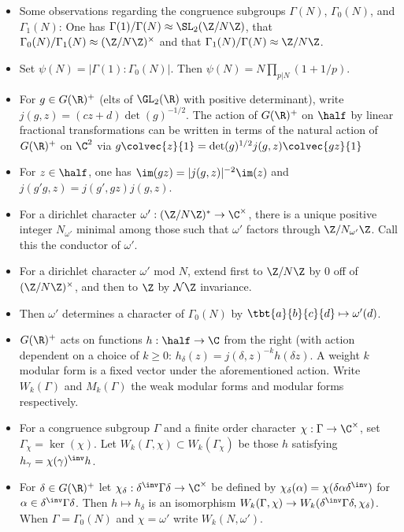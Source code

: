 \documentclass[11pt]{amsart}
\begin{document}
\begin{itemize}
   \item  Some observations regarding the congruence subgroups $\Gamma(N)$, $\Gamma_0(N)$, and $\Gamma_1(N)$: One has $\Gamma(1)/\Gamma(N) \approx \SL_2(\Z/N\Z)$,  that $\Gamma_0(N)/ \Gamma_1(N) \approx (\Z/N\Z)^\times$ and that $\Gamma_1(N)/\Gamma(N) \approx \Z/N\Z$.
   \item Set $\psi(N)=|\Gamma(1): \Gamma_0(N)|$. Then $\psi(N) = N \prod_{ p \vert N} (1+1/p)$. 
   \item For $g\in G(\R)^+$ (elts of $\GL_2(\R)$ with positive determinant), write $j(g,z)= (cz+d) \det(g)^{-1/2}$. The action of $G(\R)^+$ on $\half$ by linear fractional transformations can be written in terms of the natural action of $G(\R)^+$ on $\C^2$  via $g\colvec{z}{1} = \det(g)^{1/2} j(g,z) \colvec{gz}{1}$
   \item For $z\in  \half$, one has $\im(g z)= |j(g,z)|^{-2} \im(z)$ and $j(g'g,z)=j(g',gz)j(g,z)$. 
   \item For a dirichlet character $\omega' : (\Z/N\Z)^* \to \C^\times$, there is a unique positive integer $N_{\omega'}$  minimal among those such that $\omega'$ factors through $\Z/N_{\omega'}\Z$. Call this the conductor of $\omega'$.
   \item For a dirichlet character $\omega'$ mod $N$, extend first to $\Z/N\Z$ by $0$ off of $(\Z/N\Z)^\times$, and then to $\Z$ by $\N\Z$ invariance.
   \item Then $\omega'$ determines a character of $\Gamma_0(N)$ by $\tbt{a}{b}{c}{d} \mapsto \omega'(d)$.  
   \item $G(\R)^+$ acts on functions $h:\half \to \C$ from the right (with action dependent on a choice of $k \geq 0$: $h_\delta(z) = j(\delta ,z)^{-k}h(\delta z)$. A weight $k$ modular form is a fixed vector under the aforementioned action. Write $W_k(\Gamma)$ and $M_k(\Gamma)$ the weak modular forms and modular forms respectively. 
   \item For a congruence subgroup $\Gamma$ and a finite order character $\chi: \Gamma \to \C^\times$, set $\Gamma_\chi = \ker(\chi)$. Let $W_k(\Gamma,\chi) \subset W_k(\Gamma_\chi) $ be those $h$ satisfying $h_\gamma = \chi(\gamma)^\inv h$. 
   \item For $\delta \in G(\R)^+$ let $\chi_\delta : \delta^\inv \Gamma \delta \to \C^\times$ be defined by $\chi_\delta (\alpha)=\chi(\delta \alpha \delta^\inv)$ for $\alpha \in \delta^\inv \Gamma \delta$. Then $h\mapsto h_\delta$ is an isomorphism $W_k(\Gamma, \chi) \to W_k(\delta^\inv \Gamma \delta , \chi_\delta)$. When $\Gamma=\Gamma_0(N)$ and $\chi=\omega'$ write $W_k(N,\omega')$.

\end{itemize}
\end{document}
